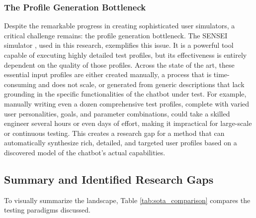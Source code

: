 \subsubsection{The Profile Generation Bottleneck}
Despite the remarkable progress in creating sophisticated user simulators,
a critical challenge remains: the profile generation bottleneck.
The SENSEI simulator \autocite{delaraSensei},
used in this research, exemplifies this issue.
It is a powerful tool capable of executing highly detailed test profiles,
but its effectiveness is entirely dependent on the quality of those profiles.
Across the state of the art,
these essential input profiles are either created manually,
a process that is time-consuming and does not scale,
or generated from generic descriptions
that lack grounding in the specific functionalities of the chatbot under test.
For example, manually writing even a dozen comprehensive test profiles,
complete with varied user personalities, goals, and parameter combinations,
could take a skilled engineer several hours or even days of effort,
making it impractical for large-scale or continuous testing.
This creates a research gap
for a method that can automatically synthesize
rich, detailed, and targeted user profiles
based on a discovered model of the chatbot's actual capabilities.

\subsection{Summary and Identified Research Gaps}

To visually summarize the landscape,
Table \ref{tab:sota_comparison}
compares the testing paradigms discussed.

\begin{table}[h!]
\centering
\caption{Comparison of State-of-the-Art Chatbot Testing Paradigms}
\label{tab:sota_comparison}
\end{table}

